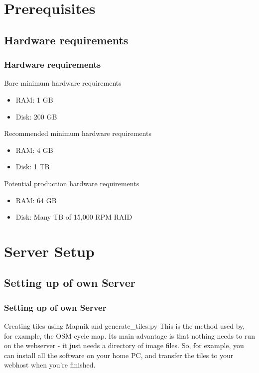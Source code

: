 \documentclass{beamer}
\begin{document}
\section{Prerequisites}
\subsection{Hardware requirements}
\begin{frame}
\frametitle{Hardware requirements}
\begin{block}{Bare minimum hardware requirements}
\begin{itemize}
\pause
\item RAM: 1 GB
\pause
\item Disk: 200 GB
\end{itemize}
\end{block}
\pause
\begin{block}{Recommended minimum hardware requirements}
\begin{itemize}
\pause
\item RAM: 4 GB
\pause
\item Disk: 1 TB
\end{itemize}
\end{block}
\pause
\begin{block}{Potential production hardware requirements}
\begin{itemize}
\pause
\item RAM: 64 GB
\pause
\item Disk: Many TB of 15,000 RPM RAID
\end{itemize}
\end{block}
\end{frame}

\section{Server Setup}
\subsection{Setting up of own Server}
\begin{frame}
\frametitle{Setting up of own Server}
\begin{block}{Creating tiles using Mapnik and generate\_tiles.py}
This is the method used by, for example, the OSM cycle map. Its main advantage is that nothing needs to run on the webserver - it just needs a directory of image files. So, for example, you can install all the software on your home PC, and transfer the tiles to your webhost when you're finished.
\end{block}
\end{frame}
\end{document}
